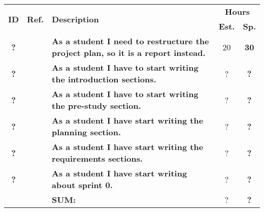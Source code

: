 \label{tab:sprint1Documentationstories}
\def\arraystretch{1.25}
 
\begin{longtable}{ccXcc}

\toprule[0.5mm]
\multirow{2}{*}{\textbf{ID}} &
\multirow{2}{*}{\textbf{Ref.}} & \multirow{2}{*}{\textbf{Description}} & \multicolumn{2}{c}{\textbf{Hours}} \\
 					& & & \textbf{Est.} & \textbf{Sp.} \\
\midrule
\textbf{?} 	& {}
	& {\bf As a student I need to restructure the project plan, so it is a report instead.} 		& 	20	& \textbf{ 30} \\

\textbf{?} 	&& {\bf As a student I have to start writing the introduction sections.} 	& 		?	& \textbf{?} \\
\textbf{?} 	&& {\bf As a student I have to start writing the pre-study section.} 	& 		?	& \textbf{?} \\
\textbf{?} 	&& {\bf As a student I have start writing the planning section.} 		& 		?	& \textbf{?} \\
\textbf{?} 	&& {\bf As a student I have start writing the requirements sections.} 		& 		?	& \textbf{?} \\
\textbf{?} 	&& {\bf As a student I have start writing about sprint 0.} 					& 		?	& \textbf{?} \\							
				
\hline
				&& \textbf{SUM:}		&		?	& \textbf{?}
 \\																			
\bottomrule[0.5mm]
\end{longtable}
